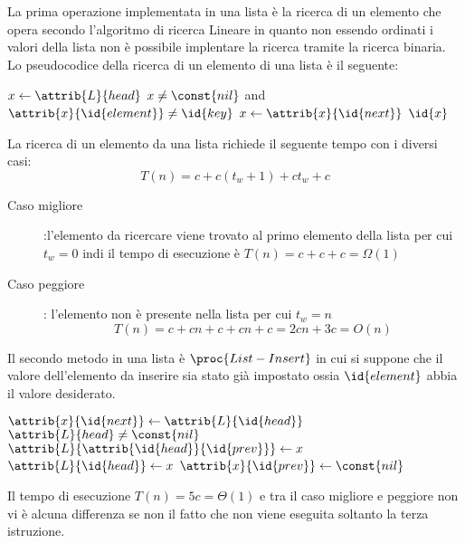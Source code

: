 La prima operazione implementata in una lista è la ricerca di un elemento che opera
secondo l'algoritmo di ricerca Lineare in quanto non essendo ordinati i valori della lista
non è possibile implentare la ricerca tramite la ricerca binaria.
Lo pseudocodice della ricerca di un elemento di una lista è il seguente:
\begin{codebox}
\li $x\gets \attrib{L}{head}$
\li \While $x \neq \const{nil}$ and $\attrib{x}{\id{element}} \neq \id{key}$
    \Do
\li                      $x \gets \attrib{x}{\id{next}}$
    \End
\li \Return $\id{x}$
\end{codebox}
La ricerca di un elemento da una lista richiede il seguente tempo con i diversi casi:
\begin{equation*}
  T(n) = c + c(t_w + 1) + ct_w + c
\end{equation*}
\begin{description}
  \item[Caso migliore]:l'elemento da ricercare viene trovato al primo elemento della lista
        per cui $t_w = 0$ indi il tempo di esecuzione è $T(n) = c + c + c = \Omega(1)$
  \item[Caso peggiore]: l'elemento non è presente nella lista per cui $t_w = n$
        \begin{equation*}
          T(n) = c + cn + c + cn + c = 2cn + 3c = O(n)
        \end{equation*}
\end{description}

Il secondo metodo in una lista è $\proc{List-Insert}$ in cui si suppone che il valore
dell'elemento da inserire sia stato già impostato ossia $\id{element}$ abbia il valore desiderato.
\begin{codebox}
\li $\attrib{x}{\id{next}} \gets \attrib{L}{\id{head}}$
\li \If $\attrib{L}{head} \neq \const{nil}$
    \Then
\li                       $\attrib{L}{\attrib{\id{head}}{\id{prev}}} \gets x$
    \End
\li $\attrib{L}{\id{head}} \gets x$
\li $\attrib{x}{\id{prev}} \gets \const{nil}$
\end{codebox}
Il tempo di esecuzione $T(n) = 5c = \Theta(1)$ e tra il caso migliore e peggiore non
vi è alcuna differenza se non il fatto che non viene eseguita soltanto la terza istruzione.

